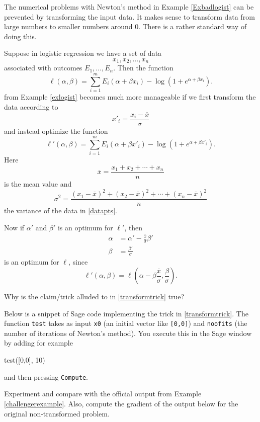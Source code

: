 \documentclass{article}
\begin{document}
The numerical problems with Newton's method in Example \ref{Exbadlogist} can be prevented by transforming the input data.
It makes sense to transform data from large numbers to
smaller numbers around $0$. There is a rather standard way of doing this.

Suppose in logistic regression we have a set of data
\begin{equation}\label{datapts}
x_1, x_2, \dots, x_n
\end{equation}
associated with outcomes $E_1, \dots, E_n$. Then the function
  $$
  \ell(\alpha, \beta) = \sum_{i=1}^m E_i (\alpha + \beta x_i) - \log(1 + e^{\alpha + \beta x_i}).
  $$
  from Example \ref{exlogist} becomes much more manageable if we first
  transform the data according to
  $$
  x'_i = \frac{x_i - \overline{x}}{\sigma} 
  $$
  and instead optimize the function
  $$
  \ell'(\alpha, \beta) = \sum_{i=1}^m E_i (\alpha + \beta x'_i) - \log(1 + e^{\alpha + \beta x'_i}).
  $$
  Here
  $$
  \overline{x} = \frac{x_1 + x_2 + \cdots + x_n}{n}
  $$
  is the mean value and
  $$
  \sigma^2 = \frac{(x_1 - \overline{x})^2 + (x_2 - \overline{x})^2 + \cdots + (x_n - \overline{x})^2}{n}
  $$
  the variance of the data in \eqref{datapts}.

  
  Now if $\alpha'$ and $\beta'$ is an optimum for $\ell'$, then
  \begin{align}\label{transformtrick}
    \alpha &= \alpha' - \frac{\overline{x}}{\sigma} \beta'\\
    \beta &= \frac{\beta'}{\sigma}
  \end{align}
  is an optimum for $\ell$, since
  $$
  \ell'(\alpha, \beta) = \ell\left(\alpha - \beta \frac{\overline{x}}{\sigma}, \frac{\beta}{\sigma}\right).
  $$

\beginshex
Why is the claim/trick alluded to in \eqref{transformtrick} true?

Below is a snippet of Sage code implementing the trick in \eqref{transformtrick}.
The function \texttt{test} takes as input \texttt{x0} (an initial vector like \texttt{[0,0]}) and
\texttt{noofits} (the number of iterations of Newton's method). You execute this in the Sage
window by adding for example
\begin{code}
  test([0,0], 10)
\end{code}
and then pressing \texttt{Compute}.

Experiment and compare with the official output from Example \ref{challengerexample}. Also, compute
the gradient of the output below for the original non-transformed problem.
\end{document}
